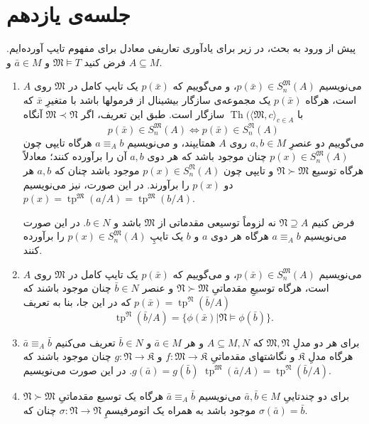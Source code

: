 \documentclass[12pt,a4paper]{report}
\theoremstyle{colorhead}
\DeclareMathOperator{\Th}{Th}
\DeclareMathOperator{\tp}{tp}
\begin{document}
\section{جلسه‌ی یازدهم}
پیش از ورود به بحث، در زیر برای یادآوری تعاریفی معادل برای مفهوم تایپ آورده‌ایم.
فرض کنید
$\mathfrak{M}\models T$
و
$\bar{a}\in M$
و
$A\subseteq M$.
\begin{enumerate}
\item 
می‌نویسیم
$p(\bar{x})\in S^\mathfrak{M}_n(A)$،
و می‌گوییم که
$p(\bar{x})$
یک تایپ کامل در
$\mathfrak{M}$
روی
$A$
است، هرگاه 
$p(\bar{x})$
یک مجموعه‌ی سازگار بیشینال از فرمولها باشد با متغیرِ
$\bar{x}$
که با
$\Th(\langle \mathfrak{M},c\rangle_{c\in A}$
سازگار است. طبق این تعریف،‌ اگر
$\mathfrak{M}\prec \mathfrak{N}$
آنگاه 
\[
p(\bar{x})\in S^\mathfrak{M}_n(A)\Leftrightarrow p(\bar{x})\in S^\mathfrak{N}_n(A)
\]
می‌گوییم دو عنصرِ
$a,b\in M$
روی
$A$
همتایپند، و می‌نویسیم
$a\equiv_{A}b$
هرگاه
تایپی چون
$p(x)\in S^\mathfrak{M}_n(A)$
چنان موجود باشد که هر دوی
$a,b$
آن را برآورده کنند؛ معادلاً هرگاه
توسیع
$\mathfrak{N}\succ \mathfrak{M}$
و تایپی چون
$p(x)\in S^\mathfrak{N}_n(A)$
موجود باشد چنان که
$a,b$
هر دو 
$p(x)$
را برآورند. در این صورت،‌ نیز می‌نویسیم
$p(x)=\tp^\mathfrak{M}(a/A)=\tp^\mathfrak{M}(b/A)$.
\par 
فرض کنیم
$\mathfrak{N}\supseteq A$
نه لزوماً
توسیعی مقدماتی از
$\mathfrak{M}$
باشد و 
$b\in  N$.
در این صورت می‌نویسیم
$a\equiv_A b$
هرگاه هر دوی 
$a$
و
$b$
یک تایپِ
$p(x)\in S^\mathfrak{M}_n(A)$
را برآورده کنند. 
\item 
می‌نویسیم
$p(\bar{x})\in S^\mathfrak{M}_n(A)$،
و می‌گوییم که
$p(\bar{x})$
یک تایپ کامل در
$\mathfrak{M}$
روی
$A$
است، هرگاه توسیعِ مقدماتیِ
$\mathfrak{N}\succ \mathfrak{M}$
و عنصر
$\bar{b}\in N$
چنان موجود باشند که
$p(\bar{x})=\tp^\mathfrak{N}(\bar{b}/A)$
که در این جا، بنا به تعریف
\[
\tp^\mathfrak{N}(\bar{b}/A)=\{\phi(\bar{x})|\mathfrak{N}\models \phi(\bar{b})\}.
\]
\item 
برای هر دو مدلِ
$\mathfrak{M},\mathfrak{N}$
که 
$A\subseteq M,N$
و هر
$\bar{a}\in M$
و
$\bar{b}\in N$
تعریف می‌کنیم
$\bar{a}\equiv_A \bar{b}$
هرگاه مدلِ
$\mathfrak{K}$
و نگاشتهای مقدماتیِ
$f:\mathfrak{M}\to \mathfrak{K}$
و
$g:\mathfrak{N}\to \mathfrak{K}$
چنان موجود باشند که 
$g(\bar{a})=g(\bar{b})$.
در این صورت می‌نویسیم
$\tp^\mathfrak{M}(\bar{a}/A)=\tp^\mathfrak{N}(\bar{b}/A)$.
\item 
برای دو چندتاییِ
$\bar{a},\bar{b}\in M$
می‌نویسیم 
$\bar{a}\equiv_A\bar{b}$
هرگاه یک توسیع مقدماتیِ
$\mathfrak{N}\succ \mathfrak{M}$
موجود باشد به همراه یک اتومرفیسمِ
$\sigma:\mathfrak{N}\to \mathfrak{N}$
چنان که
$\sigma(\bar{a})=\bar{b}$.
\end{enumerate}
\end{document}
